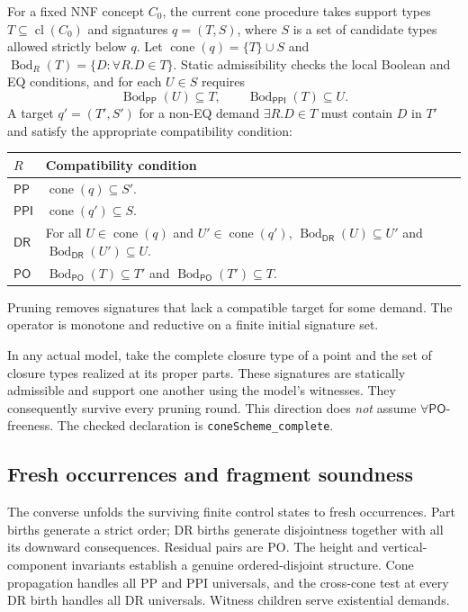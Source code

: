 \documentclass[11pt,letterpaper]{article}
\newcommand{\PP}{\mathsf{PP}}
\newcommand{\PPI}{\mathsf{PPI}}
\newcommand{\PO}{\mathsf{PO}}
\newcommand{\DR}{\mathsf{DR}}
\newcommand{\cl}{\operatorname{cl}}
\newcommand{\cone}{\operatorname{cone}}
\newcommand{\Bod}{\operatorname{Bod}}
\newcommand{\code}[1]{\texttt{#1}}
\theoremstyle{definition}
\theoremstyle{remark}
\begin{document}
For a fixed NNF concept $C_0$, the current cone procedure takes support
types $T\subseteq\cl(C_0)$ and signatures $q=(T,S)$, where $S$ is a set
of candidate types allowed strictly below $q$. Let
$\cone(q)=\{T\}\cup S$ and
$\Bod_R(T)=\{D:\forall R.D\in T\}$.
Static admissibility checks the local Boolean and EQ conditions, and
for each $U\in S$ requires
\[
\Bod_{\PP}(U)\subseteq T,
\qquad
\Bod_{\PPI}(T)\subseteq U.
\]
A target $q'=(T',S')$ for a non-EQ demand $\exists R.D\in T$ must
contain $D$ in $T'$ and satisfy the appropriate compatibility condition:
\begin{center}
\small
\begin{tabularx}{\linewidth}{@{}lY@{}}
\toprule
$R$ & Compatibility condition\\
\midrule
$\PP$ & $\cone(q)\subseteq S'$.\\
$\PPI$ & $\cone(q')\subseteq S$.\\
$\DR$ & For all $U\in\cone(q)$ and $U'\in\cone(q')$,
$\Bod_{\DR}(U)\subseteq U'$ and $\Bod_{\DR}(U')\subseteq U$.\\
$\PO$ & $\Bod_{\PO}(T)\subseteq T'$ and
$\Bod_{\PO}(T')\subseteq T$.\\
\bottomrule
\end{tabularx}
\end{center}
Pruning removes signatures that lack a compatible target for some demand.
The operator is monotone and reductive on a finite initial signature set.

In any actual model, take the complete closure type of a point and the set
of closure types realized at its proper parts. These signatures are
statically admissible and support one another using the model's witnesses.
They consequently survive every pruning round. This direction does
\emph{not} assume $\forall\PO$-freeness. The checked declaration is
\code{coneScheme\_complete}.

\subsection{Fresh occurrences and fragment soundness}

The converse unfolds the surviving finite control states to fresh
occurrences. Part births generate a strict order; DR births generate
disjointness together with all its downward consequences. Residual pairs
are PO. The height and vertical-component invariants establish a genuine
ordered-disjoint structure. Cone propagation handles all PP and PPI
universals, and the cross-cone test at every DR birth handles all DR
universals. Witness children serve existential demands.
\end{document}
